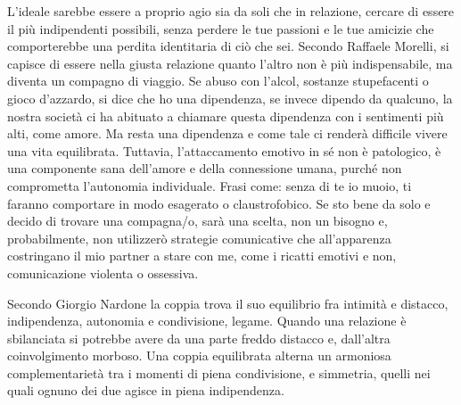 \documentclass[12pt]{book} %
\begin{document}
L'ideale sarebbe essere a proprio agio sia da soli che in relazione, cercare di essere il più indipendenti possibili, senza perdere le tue passioni e le tue amicizie che comporterebbe una perdita identitaria di ciò che sei. 
Secondo Raffaele Morelli, si capisce di essere nella giusta relazione quanto
l'altro non è più indispensabile, ma diventa un compagno di
viaggio. Se abuso con l'alcol, sostanze stupefacenti o
gioco d'azzardo, si dice che ho una dipendenza, se invece dipendo da qualcuno, la nostra società ci ha abituato a chiamare questa dipendenza con i sentimenti più alti, come amore. Ma resta una dipendenza e come tale ci renderà difficile vivere una vita equilibrata. 
Tuttavia, l’attaccamento emotivo in sé non è patologico, è una componente sana dell’amore e della connessione umana, purché non comprometta l’autonomia individuale.
Frasi come: senza di te io muoio, ti faranno comportare in modo esagerato o claustrofobico. Se sto bene da solo e decido di trovare una
compagna/o, sarà una scelta, non un bisogno e, probabilmente, non utilizzerò strategie comunicative che
all'apparenza costringano il mio partner a stare con me, come i ricatti emotivi e non, comunicazione violenta o ossessiva.

Secondo Giorgio Nardone la coppia trova il suo equilibrio fra intimità e distacco, indipendenza, autonomia e condivisione,
legame. Quando una relazione è sbilanciata si potrebbe avere da una parte freddo distacco e, dall'altra
coinvolgimento morboso. Una coppia equilibrata alterna un armoniosa complementarietà tra i momenti di piena
condivisione, e simmetria, quelli nei quali ognuno dei due agisce in piena indipendenza. 
\end{document}

